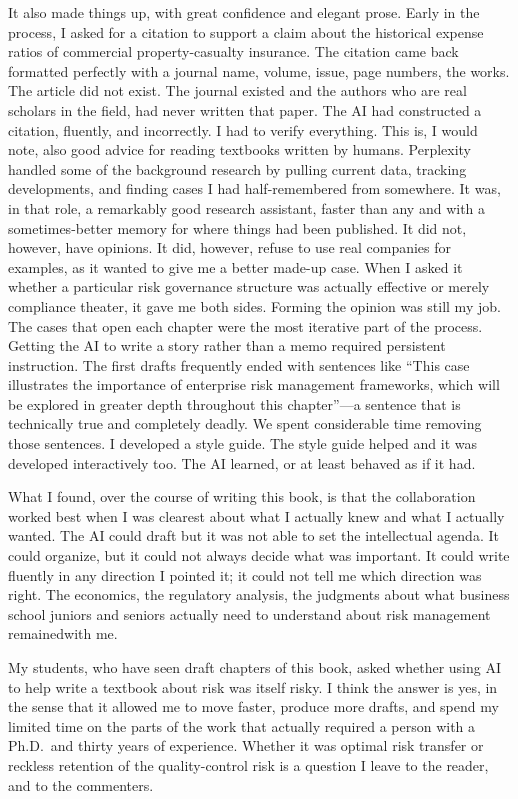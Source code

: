 \documentclass[11pt,openany]{book}
\begin{document}
It also made things up, with great confidence and elegant prose. Early in the process, I asked for a citation to support a claim about the historical expense ratios of commercial property-casualty insurance. The citation came back formatted perfectly with a journal name, volume, issue, page numbers, the works. The article did not exist. The journal existed and the authors who are real scholars in the field, had never written that paper. The AI had constructed a citation, fluently, and incorrectly. I had to verify everything. This is, I would note, also good advice for reading textbooks written by humans.
Perplexity handled some of the background research by pulling current data, tracking developments, and finding cases I had half-remembered from somewhere. It was, in that role, a remarkably good research assistant, faster than any and with a sometimes-better memory for where things had been published. It did not, however, have opinions. It did, however, refuse to use real companies for examples, as it wanted to give me a better made-up case. When I asked it whether a particular risk governance structure was actually effective or merely compliance theater, it gave me both sides. Forming the opinion was still my job. 
The cases that open each chapter were the most iterative part of the process. Getting the AI to write a story rather than a memo required persistent instruction. The first drafts frequently ended with sentences like ``This case illustrates the importance of enterprise risk management frameworks, which will be explored in greater depth throughout this chapter''---a sentence that is technically true and completely deadly. We spent considerable time removing those sentences. I developed a style guide. The style guide helped and it was developed interactively too. The AI learned, or at least behaved as if it had.

What I found, over the course of writing this book, is that the collaboration worked best when I was clearest about what I actually knew and what I actually wanted. The AI could draft but it was not able to set the intellectual agenda. It could organize, but it could not always decide what was important. It could write fluently in any direction I pointed it; it could not tell me which direction was right. The economics, the regulatory analysis, the judgments about what business school juniors and seniors actually need to understand about risk management remainedwith me.

My students, who have seen draft chapters of this book, asked whether using AI to help write a textbook about risk was itself risky. I think the answer is yes, in the sense that it allowed me to move faster, produce more drafts, and spend my limited time on the parts of the work that actually required a person with a Ph.D.\ and thirty years of experience. Whether it was optimal risk transfer or reckless retention of the quality-control risk is a question I leave to the reader, and to the commenters.
\end{document}
